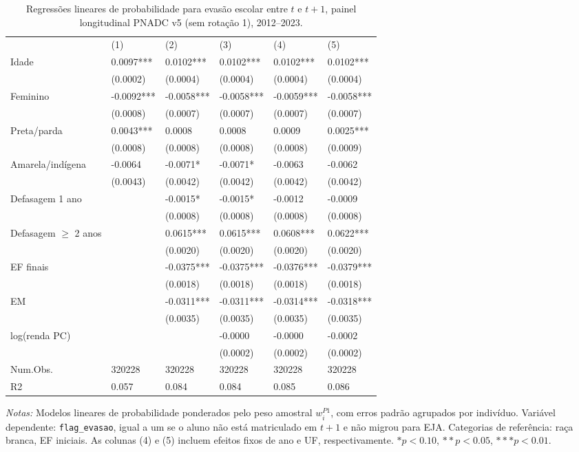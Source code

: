 \begin{table}[htbp]\centering
\caption{Regress\~oes lineares de probabilidade para evas\~ao escolar entre $t$ e $t+1$, painel longitudinal PNADC v5 (sem rota\c{c}\~ao 1), 2012--2023.}
\label{tab:reg_evasao}
\begin{threeparttable}
\footnotesize
\begin{tabular}{llllll}
& (1) & (2) & (3) & (4) & (5) \\
Idade & 0.0097*** & 0.0102*** & 0.0102*** & 0.0102*** & 0.0102*** \\
& (0.0002) & (0.0004) & (0.0004) & (0.0004) & (0.0004) \\
Feminino & -0.0092*** & -0.0058*** & -0.0058*** & -0.0059*** & -0.0058*** \\
& (0.0008) & (0.0007) & (0.0007) & (0.0007) & (0.0007) \\
Preta/parda & 0.0043*** & 0.0008 & 0.0008 & 0.0009 & 0.0025*** \\
& (0.0008) & (0.0008) & (0.0008) & (0.0008) & (0.0009) \\
Amarela/indígena & -0.0064 & -0.0071* & -0.0071* & -0.0063 & -0.0062 \\
& (0.0043) & (0.0042) & (0.0042) & (0.0042) & (0.0042) \\
Defasagem 1 ano &  & -0.0015* & -0.0015* & -0.0012 & -0.0009 \\
&  & (0.0008) & (0.0008) & (0.0008) & (0.0008) \\
Defasagem $\geq$ 2 anos &  & 0.0615*** & 0.0615*** & 0.0608*** & 0.0622*** \\
&  & (0.0020) & (0.0020) & (0.0020) & (0.0020) \\
EF finais &  & -0.0375*** & -0.0375*** & -0.0376*** & -0.0379*** \\
&  & (0.0018) & (0.0018) & (0.0018) & (0.0018) \\
EM &  & -0.0311*** & -0.0311*** & -0.0314*** & -0.0318*** \\
&  & (0.0035) & (0.0035) & (0.0035) & (0.0035) \\
log(renda PC) &  &  & -0.0000 & -0.0000 & -0.0002 \\
&  &  & (0.0002) & (0.0002) & (0.0002) \\
Num.Obs. & 320228 & 320228 & 320228 & 320228 & 320228 \\
R2 & 0.057 & 0.084 & 0.084 & 0.085 & 0.086 \\
\end{tabular}
\begin{tablenotes}\footnotesize
\item \textit{Notas:} Modelos lineares de probabilidade ponderados pelo peso amostral $w_i^{P1}$, com erros padr\~ao agrupados por indiv\'iduo. Vari\'avel dependente: \texttt{flag\_evasao}, igual a um se o aluno n\~ao est\'a matriculado em $t+1$ e n\~ao migrou para EJA. Categorias de refer\^encia: ra\c{c}a branca, EF iniciais. As colunas (4) e (5) incluem efeitos fixos de ano e UF, respectivamente. $* p < 0.10$, $** p < 0.05$, $*** p < 0.01$.
\end{tablenotes}
\end{threeparttable}
\end{table}
